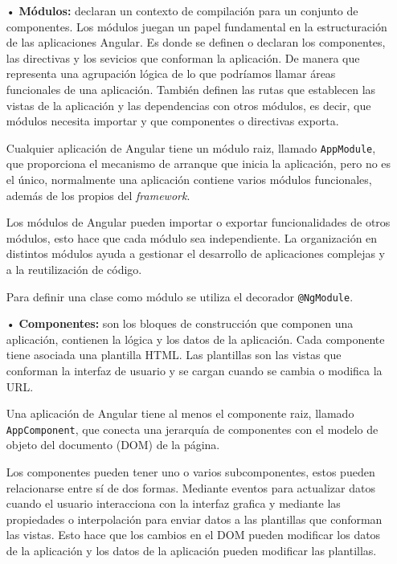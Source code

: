 \documentclass[a4paper, 12pt]{book}
\begin{document}
\begin{itemize}

	\item[•] \textbf{Módulos:} declaran un contexto de compilación para un conjunto de componentes. Los módulos juegan un papel fundamental en la estructuración de las aplicaciones Angular. Es donde se definen o declaran los componentes, las directivas y los sevicios que conforman la aplicación. De manera que representa una agrupación lógica de lo que podríamos llamar áreas funcionales de una aplicación. También definen las rutas que establecen las vistas de la aplicación y las dependencias con otros módulos, es decir, que módulos necesita importar y que componentes o directivas exporta. 
	
	Cualquier aplicación de Angular tiene un módulo raiz, llamado \texttt{AppModule}, que proporciona el mecanismo de arranque que inicia la aplicación, pero no es el único, normalmente una aplicación contiene varios módulos funcionales, además de los propios del \emph{framework}. 
	
	Los módulos de Angular pueden importar o exportar funcionalidades de otros módulos, esto hace que cada módulo sea independiente. La organización en distintos módulos ayuda a gestionar el desarrollo de aplicaciones complejas y a la reutilización de código.
	
	Para definir una clase como módulo se utiliza el decorador \texttt{@NgModule}.
	
	\item[•] \textbf{Componentes:} son los bloques de construcción que componen una aplicación, contienen la lógica y los datos de la aplicación. Cada componente tiene asociada una plantilla HTML. Las plantillas son las vistas que conforman la interfaz de usuario y se cargan cuando se cambia o modifica la URL.
	
	Una aplicación de Angular tiene al menos el componente raiz, llamado \texttt{AppComponent}, que conecta una jerarquía de componentes con el modelo de objeto del documento (DOM) de la página.
	
	Los componentes pueden tener uno o varios subcomponentes, estos pueden relacionarse entre sí de dos formas. Mediante eventos para actualizar datos cuando el usuario interacciona con la interfaz grafica y mediante las propiedades o interpolación para enviar datos a las plantillas que conforman las vistas. Esto hace que los cambios en el DOM pueden modificar los datos de la aplicación y los datos de la aplicación pueden modificar las plantillas.
	

\end{itemize}
\end{document}
